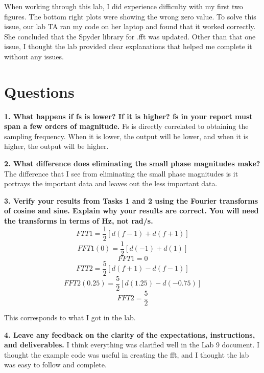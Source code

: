 \documentclass[12pt]{report}
\begin{document}
When working through this lab, I did experience difficulty with my first two figures. The bottom right plots were showing the wrong zero value. To solve this issue, our lab TA ran my code on her laptop and found that it worked correctly. She concluded that the Spyder library for .fft was updated. Other than that one issue, I thought the lab provided clear explanations that helped me complete it without any issues. 



\section{Questions}

\textbf{1. What happens if fs is lower? If it is higher? fs in your report must span a few orders of magnitude.}
{Fs is directly correlated to obtaining the sampling frequency. When it is lower, the output will be lower, and when it is higher, the output will be higher. }

\textbf{2. What difference does eliminating the small phase magnitudes make?}
{The difference that I see from eliminating the small phase magnitudes is it portrays the important data and leaves out the less important data. }

\textbf{3. Verify your results from Tasks 1 and 2 using the Fourier transforms of cosine and sine. Explain why your results are correct. You will need the transforms in terms of Hz, not rad/s.}
\begin{equation}
    FTT1 = \frac{1}{2}[d(f-1)+d(f+1)]
\end{equation}
\begin{equation}
    FFT1(0) = \frac{1}{2}[d(-1)+d(1)]
\end{equation}
\begin{equation}
    FFT1 = 0
\end{equation}
\begin{equation}
    FTT2 = \frac{5}{2}[d(f+1)-d(f-1)]
\end{equation}
\begin{equation}
    FFT2(0.25) = \frac{5}{2}[d(1.25)-d(-0.75)]
\end{equation}
\begin{equation}
    FFT2 = \frac{5}{2}
\end{equation}

{This corresponds to what I got in the lab.}

\textbf{4. Leave any feedback on the clarity of the expectations, instructions, and deliverables.}
{I think everything was clarified well in the Lab 9 document. I thought the example code was useful in creating the fft, and I thought the lab was easy to follow and complete.}
\end{document}
